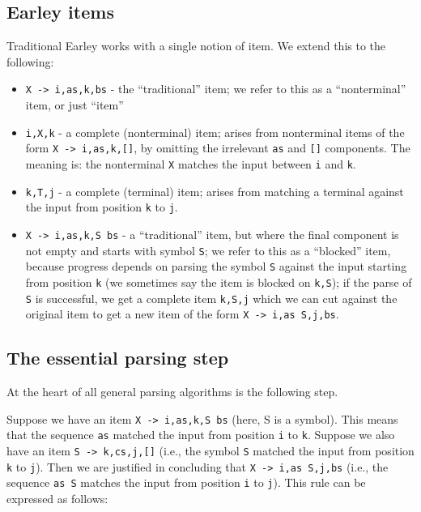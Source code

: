 \documentclass[]{article}
\begin{document}
\begin{multicols}{2}
\subsection{Earley items}

Traditional Earley works with a single notion of item. We extend this to
the following:

\begin{itemize}
\item
  \texttt{X -\textgreater{} i,as,k,bs} - the ``traditional'' item; we
  refer to this as a ``nonterminal'' item, or just ``item''
\item
  \texttt{i,X,k} - a complete (nonterminal) item; arises from
  nonterminal items of the form
  \texttt{X -\textgreater{} i,as,k,{[}{]}}, by omitting the irrelevant
  \texttt{as} and \texttt{{[}{]}} components. The meaning is: the
  nonterminal \texttt{X} matches the input between \texttt{i} and
  \texttt{k}.
\item
  \texttt{k,T,j} - a complete (terminal) item; arises from matching a
  terminal against the input from position \texttt{k} to \texttt{j}.
\item
  \texttt{X -\textgreater{} i,as,k,S bs} - a ``traditional'' item, but
  where the final component is not empty and starts with symbol
  \texttt{S}; we refer to this as a ``blocked'' item, because progress
  depends on parsing the symbol \texttt{S} against the input starting
  from position \texttt{k} (we sometimes say the item is blocked on
  \texttt{k,S}); if the parse of \texttt{S} is successful, we get a
  complete item \texttt{k,S,j} which we can cut against the original
  item to get a new item of the form
  \texttt{X -\textgreater{} i,as S,j,bs}.
\end{itemize}

\subsection{The essential parsing step}

At the heart of all general parsing algorithms is the following step.

Suppose we have an item \texttt{X -\textgreater{} i,as,k,S bs} (here, S
is a symbol). This means that the sequence \texttt{as} matched the input
from position \texttt{i} to \texttt{k}. Suppose we also have an item
\texttt{S -\textgreater{} k,cs,j,{[}{]}} (i.e., the symbol \texttt{S}
matched the input from position \texttt{k} to \texttt{j}). Then we are
justified in concluding that \texttt{X -\textgreater{} i,as S,j,bs}
(i.e., the sequence \texttt{as S} matches the input from position
\texttt{i} to \texttt{j}). This rule can be expressed as follows:


\end{multicols}
\end{document}
